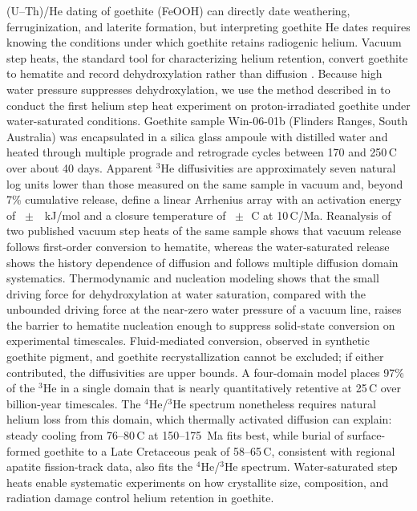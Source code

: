 (U--Th)/He dating of goethite (FeOOH) can directly date weathering, ferruginization, and
laterite formation, but interpreting goethite He dates requires knowing the conditions under
which goethite retains radiogenic helium. Vacuum step heats, the standard tool for characterizing
helium retention, convert goethite to hematite and record dehydroxylation rather than diffusion
\citep{farley2024}. Because high water pressure suppresses dehydroxylation, we use the method described
in \citep{thyer2026method} to conduct the first helium step heat
experiment on proton-irradiated goethite under water-saturated conditions. Goethite sample Win-06-01b
(Flinders Ranges, South Australia) was encapsulated in a silica glass ampoule with distilled water and heated through multiple
prograde and retrograde cycles between 170 and 250\,\textdegree C over about 40 days. Apparent
$^3$He diffusivities are approximately seven natural log units lower than those measured on the
same sample in vacuum and, beyond 7\% cumulative release, define a linear Arrhenius array with an
activation energy of \ChTwoEa{}~$\pm$~\ChTwoEaErr{}~kJ/mol and a closure temperature of
\ChTwoTc{}~$\pm$~\ChTwoTcErr{}\,\textdegree C at 10\,\textdegree C/Ma. Reanalysis of two published
vacuum step heats of the same sample shows that vacuum release follows first-order conversion to
hematite, whereas the water-saturated release shows the history dependence of diffusion and
follows multiple diffusion domain systematics. Thermodynamic and nucleation modeling shows that the small driving force for dehydroxylation at water saturation, compared with the unbounded
driving force at the near-zero water pressure of a vacuum line, raises the 
barrier to hematite nucleation enough to suppress solid-state conversion on experimental timescales. Fluid-mediated conversion, 
observed in synthetic goethite pigment, and goethite recrystallization cannot be excluded; if either contributed, the
diffusivities are upper bounds. A four-domain model places 97\% of the $^3$He in a
single domain that is nearly quantitatively retentive at 25\,\textdegree C over billion-year
timescales. The $^4$He/$^3$He spectrum nonetheless requires natural helium loss from this domain,
which thermally activated diffusion can explain: steady cooling from 76--80\,\textdegree C at
150--175~Ma fits best, while burial of surface-formed goethite to a Late Cretaceous peak of
58--65\,\textdegree C, consistent with regional apatite fission-track data, also fits the $^4$He/$^3$He spectrum.
Water-saturated step heats enable systematic experiments
on how crystallite size, composition, and radiation damage control helium retention in goethite.
